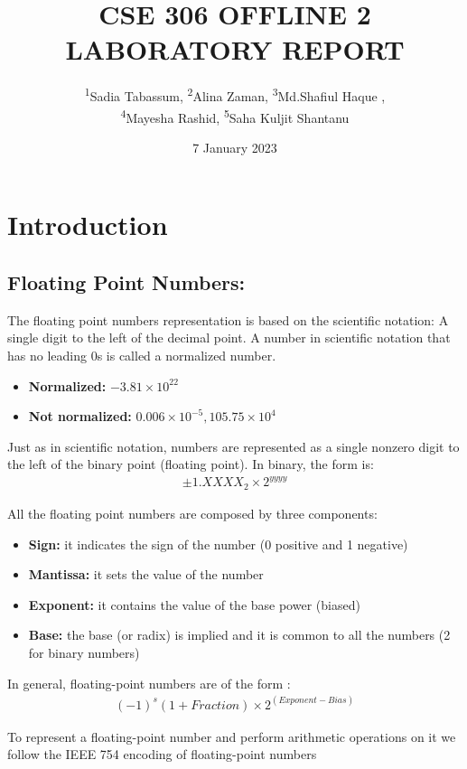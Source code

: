 \documentclass[12pt]{article}
\title{CSE 306 OFFLINE 2 LABORATORY REPORT}
\author{\textsuperscript{1}Sadia Tabassum, \textsuperscript{2}Alina Zaman, \textsuperscript{3}Md.Shafiul Haque ,\\\textsuperscript{4}Mayesha Rashid, \textsuperscript{5}Saha Kuljit Shantanu}
\date{7 January 2023}
\begin{document}
\maketitle

\section{Introduction}
\subsection{Floating Point Numbers:}
The floating point numbers representation is based on the scientific notation: A single digit to the left of the decimal point. A number in scientific notation that has no leading 0s is called a normalized number.
 \begin{itemize}
    \item[\ding{227}] \textbf{Normalized:} \(-3.81\times10^{22}\)
    \item[\ding{227}] \textbf{Not normalized:}  \(0.006\times10^{-5} , 105.75\times10^4\)
\end{itemize}
Just as in scientific notation, numbers are represented as a single nonzero digit to the left of the binary point (floating point). In binary, the form is: 
\begin{align}
  \nonumber\pm{1.XXXX}_2\times2^{yyyy}
\end{align}

All the floating point numbers are composed by three components: 
 \begin{itemize}
    \item[\ding{227}] \textbf{Sign:} it indicates the sign of the number (0 positive and 1 negative) 
    \item[\ding{227}] \textbf{Mantissa:}  it sets the value of the number 
     \item[\ding{227}] \textbf{Exponent:} it contains the value of the base power (biased)
    \item[\ding{227}] \textbf{Base:} the base (or radix) is implied and it is common to all the numbers (2 for binary numbers) 
\end{itemize}
In general, floating-point numbers are of the form :
\begin{align}
  \nonumber{(-1)}^s(1+Fraction)\times2^{(Exponent-Bias)}
\end{align}

To represent a floating-point number and perform arithmetic operations on it we follow the IEEE 754 encoding of floating-point numbers
\\\\\\
\end{document}
